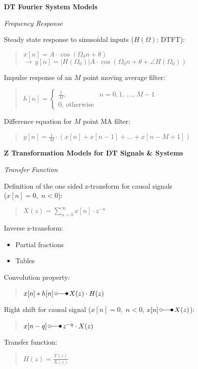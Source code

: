 \documentclass[fontsize=9pt,a4paper,twocolumn]{scrartcl}
\begin{document}
\large{\textbf{DT Fourier System Models}}

\textit{Frequency Response}

Steady state response to sinusoidal inputs ($H(\Omega)$: DTFT):
\begin{quote}
	$x[n] = A\cdot\cos(\Omega_0 n + \theta)$\\
	$\to\,y[n] = |H(\Omega_0)|A\cdot\cos\left(\Omega_0 n+\theta+\angle H(\Omega_0)\right)$
\end{quote}

Impulse response of an $M$ point moving average filter:
\begin{quote}
	$h[n] = \begin{cases}\frac{1}{M},\, & n=0,1,\,\dots,\,M-1\\ 0,\,\text{otherwise}\end{cases}$
\end{quote}

Difference equation for $M$ point MA filter:
\begin{quote}
	$y[n] = \frac{1}{M}\cdot\left(x[n]+x[n-1]+\dots+x[n-M+1]\right)$
\end{quote}

\large{\textbf{Z Transformation Models for DT Signals \& Systems}}

\textit{Transfer Function}

Definition of the one sided z-transform for causal signals \\($x[n]=0,\,\,n<0$):
\begin{quote}
	$X(z) = \sum_{n=0}^\infty x[n]\cdot z^{-n}$
\end{quote}

Inverse z-transform:
\begin{itemize}
	\item Partial fractions
	\item Tables
\end{itemize}

Convolution property:
\begin{quote}
	$x[n]*h[n]\,\laplace\,X(z)\cdot H(z)$
\end{quote}

Right shift for causal signal ($x[n]=0,\,\,n<0$, $x[n]\,\laplace\,X(z)$):
\begin{quote}
	$x[n-q]\,\laplace\,z^{-q}\cdot X(z)$
\end{quote}

Transfer function:
\begin{quote}
	$H(z) = \frac{Y(z)}{X(z)}$
\end{quote}
\end{document}

